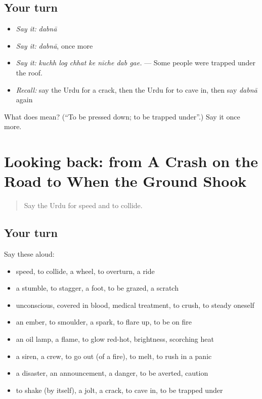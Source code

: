 \subsection*{Your turn}
\begin{itemize}
\raggedright
  \item \emph{Say it:} \emph{dabnā}
  \item \emph{Say it:} \emph{dabnā}, once more
  \item \emph{Say it:} \emph{kuchh log chhat ke nīche dab gae.} — Some people were trapped under the roof.
  \item \emph{Recall:} say the Urdu for a crack, then the Urdu for to cave in, then say \emph{dabnā} again
\end{itemize}

\begin{tcolorbox}[breakable,colback=teal!4,colframe=teal!35!black,title={Before you move on}]
What does  mean? (\textquotedblleft{}To be pressed down; to be trapped under\textquotedblright{}.) Say it once more.
\end{tcolorbox}
\section[(dialogue)]{Looking back: from A Crash on the Road to When the Ground Shook}

\label{lesson:UR-R291-review-284-291}



\begin{quote}
Say the Urdu for speed and to collide.
\end{quote}

\subsection*{Your turn}
Say these aloud:

\begin{itemize}
\raggedright
  \item speed, to collide, a wheel, to overturn, a ride
  \item a stumble, to stagger, a foot, to be grazed, a scratch
  \item unconscious, covered in blood, medical treatment, to crush, to steady oneself
  \item an ember, to smoulder, a spark, to flare up, to be on fire
  \item an oil lamp, a flame, to glow red-hot, brightness, scorching heat
  \item a siren, a crew, to go out (of a fire), to melt, to rush in a panic
  \item a disaster, an announcement, a danger, to be averted, caution
  \item to shake (by itself), a jolt, a crack, to cave in, to be trapped under
\end{itemize}

